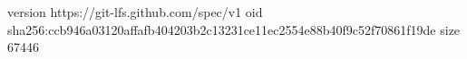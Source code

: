 version https://git-lfs.github.com/spec/v1
oid sha256:ccb946a03120affafb404203b2c13231ce11ec2554e88b40f9c52f70861f19de
size 67446
